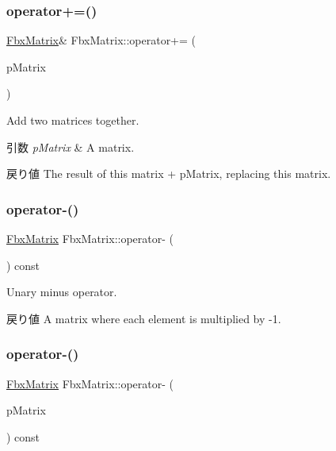 \subsubsection{\texorpdfstring{operator+=()}{operator+=()}}
{\footnotesize\ttfamily \hyperlink{class_fbx_matrix}{Fbx\+Matrix}\& Fbx\+Matrix\+::operator+= (\begin{DoxyParamCaption}\item[{const \hyperlink{class_fbx_matrix}{Fbx\+Matrix} \&}]{p\+Matrix }\end{DoxyParamCaption})}

Add two matrices together. 
\begin{DoxyParams}{引数}
{\em p\+Matrix} & A matrix. \\
\hline
\end{DoxyParams}
\begin{DoxyReturn}{戻り値}
The result of this matrix + p\+Matrix, replacing this matrix. 
\end{DoxyReturn}
\mbox{\label{class_fbx_matrix_a598bafa12879f9f233d8b5524ebdaad2}} 
\subsubsection{\texorpdfstring{operator-\/()}{operator-()}\hspace{0.1cm}{\footnotesize\ttfamily [1/2]}}
{\footnotesize\ttfamily \hyperlink{class_fbx_matrix}{Fbx\+Matrix} Fbx\+Matrix\+::operator-\/ (\begin{DoxyParamCaption}{ }\end{DoxyParamCaption}) const}

Unary minus operator. \begin{DoxyReturn}{戻り値}
A matrix where each element is multiplied by -\/1. 
\end{DoxyReturn}
\mbox{\label{class_fbx_matrix_a5a8209e3a84baf3961be72e9e7fa5c69}} 
\subsubsection{\texorpdfstring{operator-\/()}{operator-()}\hspace{0.1cm}{\footnotesize\ttfamily [2/2]}}
{\footnotesize\ttfamily \hyperlink{class_fbx_matrix}{Fbx\+Matrix} Fbx\+Matrix\+::operator-\/ (\begin{DoxyParamCaption}\item[{const \hyperlink{class_fbx_matrix}{Fbx\+Matrix} \&}]{p\+Matrix }\end{DoxyParamCaption}) const}

